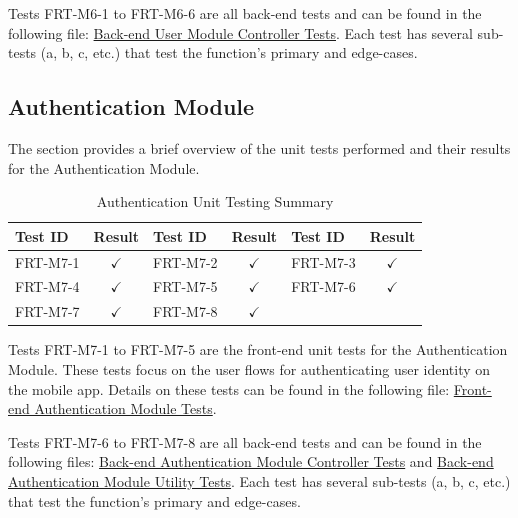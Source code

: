 \documentclass[12pt, titlepage]{article}
\begin{document}
Tests FRT-M6-1 to FRT-M6-6 are all back-end tests and can be found in the following file: \href{https://github.com/grocery-spending-tracker/grocery-spending-tracker-backend/blob/master/tests/controllers/usersController.users.test.js}{Back-end User Module Controller Tests}. Each test has several sub-tests (a, b, c, etc.) that test the function's primary and edge-cases.


\subsection{Authentication Module}

The section provides a brief overview of the unit tests performed and their results for the
Authentication Module.

\begin{longtable}{|l|c|l|c|l|c|}
  \caption{Authentication Unit Testing Summary} \label{Authentication Unit Test Summary} \\
  \toprule
  \textbf{Test ID} & \textbf{Result} & \textbf{Test ID} & \textbf{Result} & \textbf{Test ID} & \textbf{Result} \\
  \midrule
  FRT-M7-1 & $\checkmark$ & FRT-M7-2 & $\checkmark$ & FRT-M7-3 & $\checkmark$ \\
  \midrule
  FRT-M7-4 & $\checkmark$ & FRT-M7-5 & $\checkmark$ & FRT-M7-6 & $\checkmark$ \\
  \midrule
  FRT-M7-7 & $\checkmark$ & FRT-M7-8 & $\checkmark$  &  &\\
  \bottomrule
\end{longtable}

Tests FRT-M7-1 to FRT-M7-5 are the front-end unit tests for the Authentication Module. These tests focus on the user flows for authenticating user identity on the mobile app. Details on these tests can be found in the following file: \href{https://github.com/allanfang1/grocery_spending_tracker_app/blob/main/test/profile_provider_test.dart}{Front-end Authentication Module Tests}.

Tests FRT-M7-6 to FRT-M7-8 are all back-end tests and can be found in the following files: \href{https://github.com/grocery-spending-tracker/grocery-spending-tracker-backend/blob/master/tests/controllers/authController.test.js}{Back-end Authentication Module Controller Tests} and \href{https://github.com/grocery-spending-tracker/grocery-spending-tracker-backend/blob/master/tests/util/authentication.test.js}{Back-end Authentication Module Utility Tests}. Each test has several sub-tests (a, b, c, etc.) that test the function's primary and edge-cases.
\end{document}
